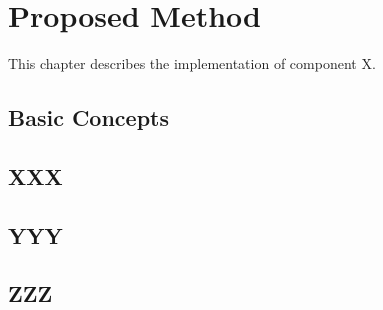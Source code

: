 \chapter{Proposed Method\label{cha:chapter3}}

This chapter describes the implementation of component X.

\section{Basic Concepts\label{sec:ch3basic}}

\section{XXX\label{sec:ch3xxx}}

\section{YYY\label{sec:ch3yyy}}

\section{ZZZ\label{sec:ch3zzz}}